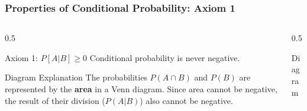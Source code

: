 \begin{frame}
    \frametitle{Properties of Conditional Probability: Axiom 1}
    
    \begin{columns}[T]
        \begin{column}{0.5\textwidth}
            \begin{block}{Axiom 1: \(P[A|B] \ge 0\)}
                Conditional probability is never negative.
            \end{block}
            
            \begin{block}{Diagram Explanation}
                The probabilities \(P(A \cap B)\) and \(P(B)\) are represented by the \textbf{area} in a Venn diagram. Since area cannot be negative, the result of their division (\(P(A|B)\)) also cannot be negative.
            \end{block}
        \end{column}
        
        \begin{column}{0.5\textwidth}
            \begin{block}{Diagram}
                \centering
            \end{block}
        \end{column}
    \end{columns}
\end{frame}

